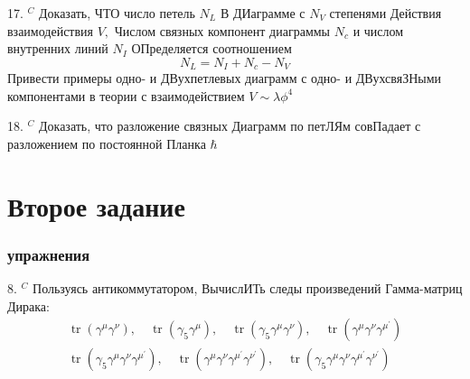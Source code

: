 \documentclass[a4paper,12pt]{article} %
\begin{document}
\begin{ttask}

17. $^{C}$ Доказать, ЧТО число петель $N_{L}$ В ДИаграмме с $N_{V}$ степенями Действия взаимодействия $V,$ Числом связных компонент диаграммы $N_{c}$ и числом внутренних линий $N_{I}$ ОПределяется соотношением
$$
N_{L}=N_{I}+N_{c}-N_{V}
$$
Привести примеры одно- и ДВухпетлевых диаграмм с одно- и ДВухсвяЗНыми компонентами в теории с взаимодействием $V \sim \lambda \phi^{4}$


\end{ttask}



\begin{ttask}


18. $^{C}$ Доказать, что разложение связных Диаграмм по петЛЯм совПадает с разложением по постоянной Планка $\hbar$

\end{ttask}













\clearpage
\part{Второе задание}


\section{упражнения}

\begin{task}

8. $^{C}$ Пользуясь антикоммутатором, ВычислИТь следы произведений Гамма-матриц Дирака:
$$
\begin{array}{l}
\operatorname{tr}\left(\gamma^{\mu} \gamma^{\nu}\right), \quad \operatorname{tr}\left(\gamma_{5} \gamma^{\mu}\right), \quad \operatorname{tr}\left(\gamma_{5} \gamma^{\mu} \gamma^{\nu}\right), \quad \operatorname{tr}\left(\gamma^{\mu} \gamma^{\nu} \gamma^{\mu^{\prime}}\right) \\
\operatorname{tr}\left(\gamma_{5} \gamma^{\mu} \gamma^{\nu} \gamma^{\mu^{\prime}}\right), \quad \operatorname{tr}\left(\gamma^{\mu} \gamma^{\nu} \gamma^{\mu^{\prime}} \gamma^{\nu^{\prime}}\right), \quad \operatorname{tr}\left(\gamma_{5} \gamma^{\mu} \gamma^{\nu} \gamma^{\mu^{\prime}} \gamma^{\nu^{\prime}}\right)
\end{array}
$$


\end{task}
\end{document}
